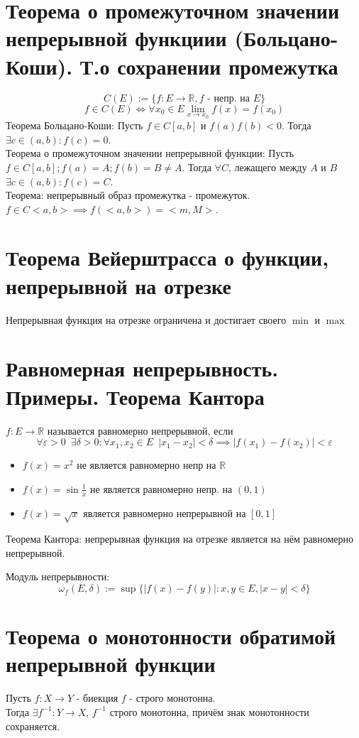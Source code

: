 \documentclass[11pt, a4paper, utf-8]{article}
\def\R{\mathbb{R}}
\def\sp{\, \, \,}
\begin{document}
    \section{Теорема о промежуточном значении непрерывной функциии (Больцано-Коши). Т.о сохранении промежутка}
    $$C(E) := \{f: E \to \R , f \text{ - непр. на } E\}$$
    $$f \in C (E) \iff \forall x_0 \in E \lim_{x \to x_0} f(x) = f(x_0)$$
    Теорема Больцано-Коши: Пусть $f \in C[a,b]$ и $f(a)f(b) < 0$. Тогда $\exists c \in (a,b): f(c) = 0$.\\
    Теорема о промежуточном значении непрерывной функции: Пусть $f \in C[a,b]; f(a) = A; f(b) = B \neq A$. Тогда $\forall C$, лежащего между $A$ и $B$ $\exists c \in (a,b): f(c) = C$.\\
    Теорема: непрерывный образ промежутка - промежуток.\\
    $f \in C <a,b> \implies f(<a, b>) = <m, M>$.

    \section{Теорема Вейерштрасса о функции, непрерывной на отрезке}
    Непрерывная функция на отрезке ограничена и достигает своего $\min$ и $\max$

    \section{Равномерная непрерывность. Примеры. Теорема Кантора}
    $f: E \to \R$ называется равномерно непрерывной, если
    $$\forall \varepsilon > 0 \sp \exists \delta > 0: \forall x_1, x_2 \in E \sp |x_1 - x_2| < \delta \implies |f(x_1) - f(x_2)| < \varepsilon$$
    \begin{itemize}
        \item $f(x) = x^2$ не является равномерно непр на $\R$
        \item $f(x) = \sin \frac{1}{x}$ не является равномерно непр. на $(0, 1)$
        \item $f(x) = \sqrt{x}$ является равномерно непрерывной на $[0, 1]$
    \end{itemize}
    Теорема Кантора: непрерывная функция на отрезке является на нём равномерно непрерывной.

    Модуль непрерывности:
    $$\omega _f (E, \delta) := \sup \{|f(x) - f(y)|: x, y \in E, |x-y| < \delta\}$$

    \section{Теорема о монотонности обратимой непрерывной функции}
    Пусть $f: X \to Y$ - биекция $f$ - строго монотонна.\\
    Тогда $\exists f^{-1} : Y \to X$, $f^{-1}$ строго монотонна, причём знак монотонности сохраняется.
\end{document}
